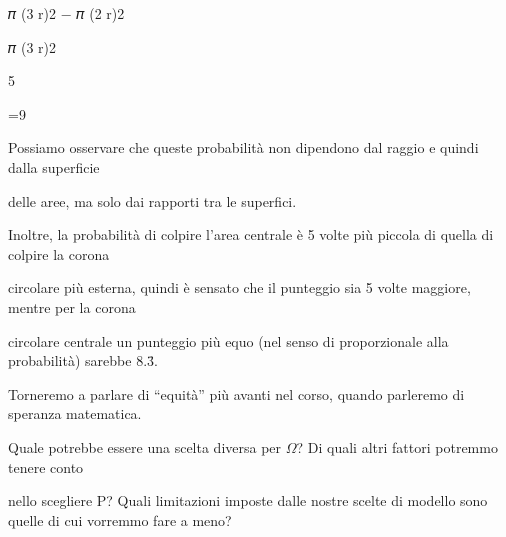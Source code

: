\documentclass[a4paper,portrait,12pt]{article}
\begin{document}
\begin{flushleft}
𝜋 (3 r)2 $-$ 𝜋 (2 r)2
\end{flushleft}


\begin{flushleft}
𝜋 (3 r)2
\end{flushleft}





5





=9





\begin{flushleft}
Possiamo osservare che queste probabilit\`{a} non dipendono dal raggio e quindi dalla superficie
\end{flushleft}


\begin{flushleft}
delle aree, ma solo dai rapporti tra le superfici.
\end{flushleft}


\begin{flushleft}
Inoltre, la probabilit\`{a} di colpire l'area centrale \`{e} 5 volte più piccola di quella di colpire la corona
\end{flushleft}


\begin{flushleft}
circolare più esterna, quindi \`{e} sensato che il punteggio sia 5 volte maggiore, mentre per la corona
\end{flushleft}


\begin{flushleft}
circolare centrale un punteggio più equo (nel senso di proporzionale alla probabilit\`{a}) sarebbe 8.3̄.
\end{flushleft}


\begin{flushleft}
Torneremo a parlare di {``}equit\`{a}'' più avanti nel corso, quando parleremo di speranza matematica.
\end{flushleft}


\begin{flushleft}
Quale potrebbe essere una scelta diversa per $\Omega$? Di quali altri fattori potremmo tenere conto
\end{flushleft}


\begin{flushleft}
nello scegliere P? Quali limitazioni imposte dalle nostre scelte di modello sono quelle di cui vorremmo fare a meno?
\end{flushleft}
\end{document}
